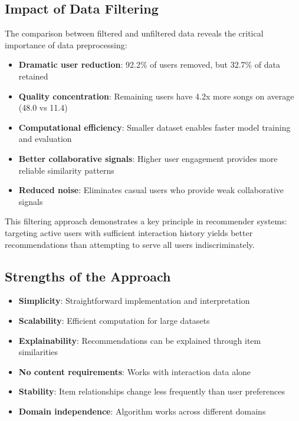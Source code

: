 \documentclass[12pt,a4paper]{article}
\begin{document}
\subsection{Impact of Data Filtering}

The comparison between filtered and unfiltered data reveals the critical importance of data preprocessing:

\begin{itemize}
    \item \textbf{Dramatic user reduction}: 92.2\% of users removed, but 32.7\% of data retained
    \item \textbf{Quality concentration}: Remaining users have 4.2x more songs on average (48.0 vs 11.4)
    \item \textbf{Computational efficiency}: Smaller dataset enables faster model training and evaluation
    \item \textbf{Better collaborative signals}: Higher user engagement provides more reliable similarity patterns
    \item \textbf{Reduced noise}: Eliminates casual users who provide weak collaborative signals
\end{itemize}

This filtering approach demonstrates a key principle in recommender systems: targeting active users with sufficient interaction history yields better recommendations than attempting to serve all users indiscriminately.

\subsection{Strengths of the Approach}

\begin{itemize}
    \item \textbf{Simplicity}: Straightforward implementation and interpretation
    \item \textbf{Scalability}: Efficient computation for large datasets
    \item \textbf{Explainability}: Recommendations can be explained through item similarities
    \item \textbf{No content requirements}: Works with interaction data alone
    \item \textbf{Stability}: Item relationships change less frequently than user preferences
    \item \textbf{Domain independence}: Algorithm works across different domains
\end{itemize}
\end{document}
